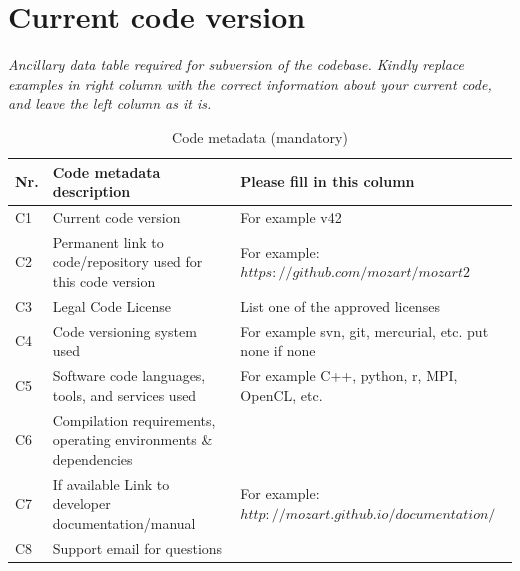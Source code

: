 \documentclass[preprint,12pt, a4paper]{elsarticle}
\begin{document}
\section*{Current code version}\label{sec:src_version}

{\em Ancillary data table required for subversion of the codebase. Kindly
replace examples in right column with the correct information about your
current code, and leave the left column as it is.

\begin{table}[!ht]
\begin{tabular}{|l|p{6.5cm}|p{6.5cm}|}
\hline
\textbf{Nr.}                                                     & 
\textbf{Code metadata description}                               & 
\textbf{Please fill in this column}                              \\
\hline
C1                                                               & 
Current code version                                             & 
For example v42                                                  \\
\hline
C2                                                               & 
Permanent link to code/repository used for this code version     & 
For example: $https://github.com/mozart/mozart2$                 \\
\hline
C3                                                               & 
Legal Code License                                               & 
List one of the approved licenses                                \\
\hline
C4                                                               & 
Code versioning system used                                      & 
For example svn, git, mercurial, etc. put none if none           \\
\hline
C5                                                               & 
Software code languages, tools, and services used                & 
For example C++, python, r, MPI, OpenCL, etc.                    \\
\hline
C6                                                               & 
Compilation requirements, operating environments \& dependencies & 
                                                                 \\
\hline
C7                                                               & 
If available Link to developer documentation/manual              & 
For example: $http://mozart.github.io/documentation/$            \\
\hline
C8                                                               & 
Support email for questions                                      & 
                                                                 \\
\hline
\end{tabular}
\caption{Code metadata (mandatory)}\label{tab:src_metadata} 
\end{table}}
\end{document}

